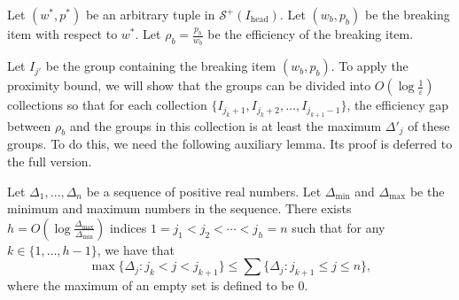 \documentclass[a4paper,UKenglish,cleveref, autoref, thm-restate, pdfa]{lipics-v2021}
\newcommand{\eps}{\varepsilon}
\renewcommand{\leq}{\leqslant}
\begin{document}
Let $(w^*, p^*)$ be an arbitrary tuple in $\mathcal{S}^+(I_{\mathrm{head}})$. Let $(w_b, p_b)$ be the breaking item with respect to $w^*$. Let $\rho_b = \frac{p_b}{w_b}$ be the efficiency of the breaking item. 

Let $I_{j'}$ be the group containing the breaking item $(w_b, p_b)$. To apply the proximity bound, we will show that the groups can be divided into  $O(\log \frac{1}{\eps})$ collections so that for each collection $\{I_{j_{k} + 1}, I_{j_{k} + 2}, \ldots, I_{j_{k+1}-1} \}$, the efficiency gap between $\rho_b$ and the groups in this collection is at least the maximum $\Delta'_j$ of these groups. To do this,
we need the following auxiliary lemma. Its proof is deferred to the full version.

\begin{lemma}\label{lem:cluster-incomp}
    Let $\Delta_1, \ldots, \Delta_n$ be a sequence of positive real numbers. Let $\Delta_{\min}$ and $\Delta_{\max}$ be the minimum and maximum numbers in the sequence. There exists $h = O(\log \frac{\Delta_{\max}}{\Delta_{\min}})$ indices $1 = j_1 < j_2 < \cdots < j_h = n$ such that for any $k \in \{1, \ldots, h-1\}$, we have that
    \begin{equation}\label{eq:cluster-original-incomp}
            \max\{\Delta_j : j_k < j < j_{k+1}\} \leq \sum\{\Delta_j : j_{k+1} \leq j \leq n\},
    \end{equation}
    where the maximum of an empty set is defined to be $0$.
\end{lemma}
\end{document}
